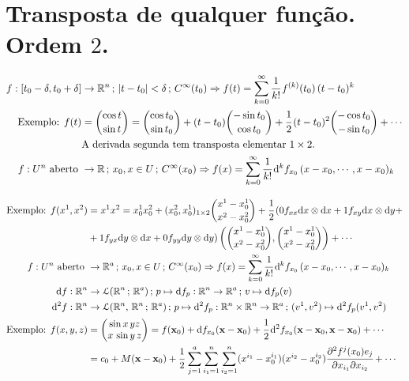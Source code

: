 \documentclass[12pt]{article}
\begin{document}
\section{Transposta de qualquer fun\c{c}\~ao. Ordem $2$.}

\begin{align}
  f : [t_0 - \delta, t_0 + \delta] &\rightarrow \mathbb{R}^n\,;\,\vert t - t_0\vert < \delta\,;\,C^\infty(t_0) \Rightarrow f(t) = \sum_{k = 0}^{\infty} \cfrac{1}{k!}\, f^{(k)} (t_0)\,(t - t_0)^k \\
  \text{Exemplo: } f(t) &= \binom{\cos t}{\sin t} = \binom{\cos t_0}{\sin t_0} + (t - t_0) \binom{- \sin t_0}{\cos t_0} + \cfrac{1}{2}\,(t - t_0)^2 \binom{- \cos t_0}{- \sin t_0} + \cdots \\
  &\text{A derivada segunda tem transposta elementar }1 \times 2. \\
  f : U^n\text{ aberto } &\rightarrow \mathbb{R}\,;\,x_0, x \in U\,;\,C^\infty(x_0) \Rightarrow f(x) = \sum_{k = 0}^{\infty} \cfrac{1}{k!}\, \mathrm{d}^{k} f_{x_0}\,(x - x_0, \cdots, x - x_0)_{k}
\end{align}

\begin{align}
  \text{Exemplo: } f(x^1,x^2) &= x^1 x^2 = x_0^1 x_0^2 + (x_0^2, x_0^1)_{1 \times 2} \binom{x^1 - x_0^1}{x^2 - x_0^2} + \cfrac{1}{2}\,(0 f_{xx} \mathrm{d}x \otimes \mathrm{d}x + 1 f_{xy} \mathrm{d}x \otimes \mathrm{d}y + \\
  &+ 1 f_{yx} \mathrm{d}y \otimes \mathrm{d}x + 0 f_{yy} \mathrm{d}y \otimes \mathrm{d}y)\left(\binom{x^1 - x_0^1}{x^2 - x_0^2}, \binom{x^1 - x_0^1}{x^2 - x_0^2}\right) + \cdots \\
  f: U^n\text{ aberto } &\rightarrow \mathbb{R}^a \,;\,x_0, x \in U\,;\,C^\infty(x_0) \Rightarrow f(x) = \sum_{k = 0}^{\infty} \cfrac{1}{k!}\, \mathrm{d}^{k} f_{x_0}\,(x - x_0, \cdots, x - x_0)_{k} \\
  \mathrm{d}f : \mathbb{R}^n &\rightarrow \mathcal{L}(\mathbb{R}^n\,;\,\mathbb{R}^a)\,;\,p \mapsto \mathrm{d}f_p : \mathbb{R}^n \rightarrow \mathbb{R}^a\,;\,v \mapsto \mathrm{d}f_p(v) \\
  \mathrm{d}^2f : \mathbb{R}^n &\rightarrow \mathcal{L}(\mathbb{R}^n,\,\mathbb{R}^n\,;\,\mathbb{R}^a)\,;\,p \mapsto \mathrm{d}^2 f_p : \mathbb{R}^n \times \mathbb{R}^n \rightarrow \mathbb{R}^a\,;\,(v^1, v^2) \mapsto \mathrm{d}^2f_p(v^1, v^2) \\
  \text{Exemplo: }f(x,y,z) &= \left( \begin{matrix} \sin x\,yz \\ x\,\sin y\,z \end{matrix} \right) = f(\mathbf{x}_0) + \mathrm{d}f_{x_0}(\mathbf{x} - \mathbf{x}_0) + \cfrac{1}{2}\, \mathrm{d}^2 f_{x_0}(\mathbf{x} - \mathbf{x}_0, \mathbf{x} - \mathbf{x}_0) + \cdots \\
  &= c_0 + M (\mathbf{x} - \mathbf{x}_0) + \cfrac{1}{2}\, \sum_{j = 1}^a \sum_{i_1 = 1}^n \sum_{i_2 = 1}^n (x^{i_1} - x_0^{i_1}) (x^{i_2} - x_0^{i_2}) \cfrac{\partial^2 f^j(x_0) e_j}{\partial x_{i_1} \partial x_{i_2}} + \cdots
\end{align}
\end{document}
